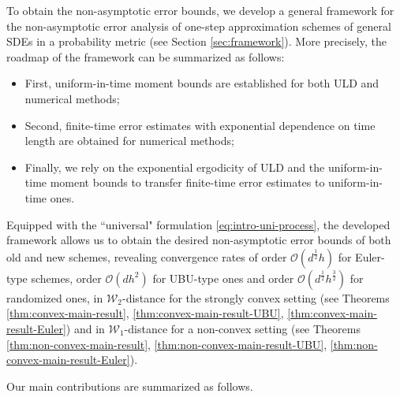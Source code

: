 \documentclass[12pt]{article}
\numberwithin{equation}{section}
\begin{document}
To obtain the non-asymptotic error bounds, we develop a general framework for the non-asymptotic error analysis of one-step approximation schemes of general SDEs in a probability metric (see Section \ref{sec:framework}). 
More precisely, 
the roadmap of the framework can be summarized as follows:
\begin{itemize}
\item First, uniform-in-time moment bounds are established for both ULD and numerical methods; 
%
\item Second, finite-time error estimates with exponential dependence on time length are obtained for numerical methods;
%
\item Finally, we rely on the exponential ergodicity of ULD and the uniform-in-time moment bounds to transfer finite-time error estimates to uniform-in-time ones.
\end{itemize}
%
Equipped with the ``universal" formulation \eqref{eq:intro-uni-process},
%
the developed framework allows us to obtain the desired non-asymptotic error bounds of both old and new schemes, revealing convergence rates of order $\mathcal{O}(d^{\frac{1}{2}}h)$ for Euler-type schemes, order $\mathcal{O}(d h^2)$ for UBU-type ones and order $\mathcal{O}(d^{\frac{1}{2}}h^{\frac{3}{2}})$ for randomized ones, in $\mathcal{W}_2$-distance for the strongly convex setting (see Theorems \ref{thm:convex-main-result}, \ref{thm:convex-main-result-UBU}, \ref{thm:convex-main-result-Euler}) and in $\mathcal{W}_1$-distance for a non-convex setting (see Theorems \ref{thm:non-convex-main-result}, \ref{thm:non-convex-main-result-UBU}, \ref{thm:non-convex-main-result-Euler}).
%
%

Our main contributions are summarized as follows. 
\end{document}
